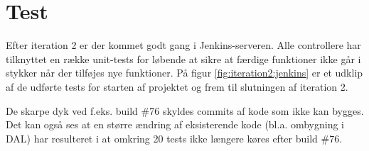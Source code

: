 \section{Test}

Efter iteration 2 er der kommet godt gang i Jenkins-serveren. Alle controllere har tilknyttet en række unit-tests for løbende at sikre at færdige funktioner ikke går i stykker når der tilføjes nye funktioner.
På figur \ref{fig:iteration2:jenkins} er et udklip af de udførte tests for starten af projektet og frem til slutningen af iteration 2.


De skarpe dyk ved f.eks. build \#76 skyldes commits af kode som ikke kan bygges.
Det kan også ses at en større ændring af eksisterende kode (bl.a. ombygning i DAL) har resulteret i at omkring 20 tests ikke længere køres efter build \#76.
